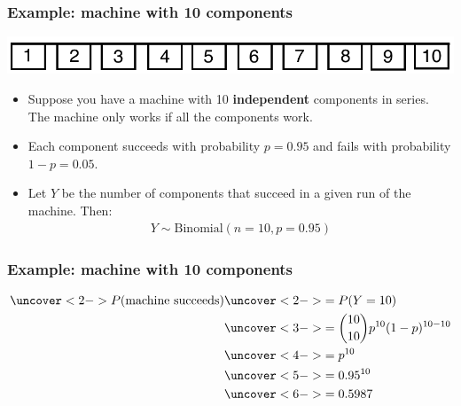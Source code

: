 \documentclass[handout]{beamer}\usepackage[]{graphicx}\usepackage[]{color}
\numberwithin{equation}{section}
\begin{document}
\begin{frame}
\frametitle{Example: machine with 10 components}
\begin{center}
 \includegraphics{../../fig/mach1.png}
\end{center}
\begin{itemize}
\pause \item Suppose you have a machine with 10 {\bf independent} components in series. The machine only works if all the components work.
\pause \item Each component succeeds with probability $p = 0.95$ and fails with probability $1 - p = 0.05$.  \
\pause \item Let $Y$ be the number of components that succeed in a given run of the machine. Then:
\begin{align*}
Y \sim \text{Binomial}(n = 10, p = 0.95)
\end{align*}
\end{itemize}

\end{frame}

\begin{frame}
\frametitle{Example: machine with 10 components}
\begin{align*}
\uncover<2->{P(\text{machine succeeds})} &\uncover<2->{= P(Y = 10)} \\
&\uncover<3->{= \binom{10}{10}p^{10} (1-p)^{10 - 10}} \\
&\uncover<4->{= p^{10}} \\
&\uncover<5->{=0.95^{10}} \\
&\uncover<6->{= 0.5987}
\end{align*}
\begin{itemize}
\end{itemize}
\end{frame}
\end{document}
